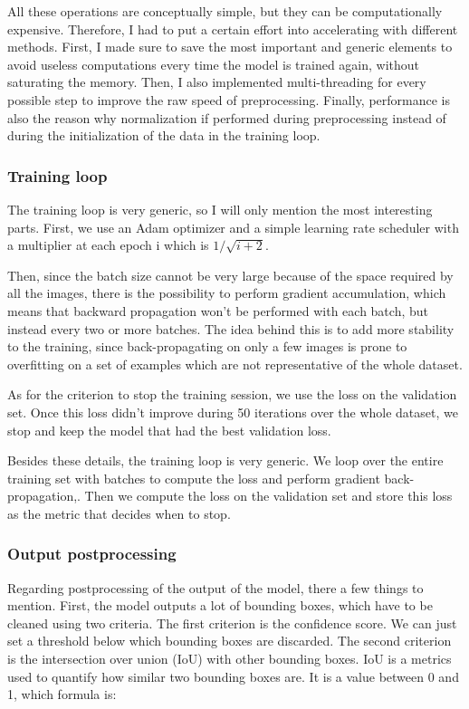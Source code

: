 \documentclass[
  letterpaper,
  DIV=11,
  numbers=noendperiod]{scrartcl}
\begin{document}
All these operations are conceptually simple, but they can be
computationally expensive. Therefore, I had to put a certain effort into
accelerating with different methods. First, I made sure to save the most
important and generic elements to avoid useless computations every time
the model is trained again, without saturating the memory. Then, I also
implemented multi-threading for every possible step to improve the raw
speed of preprocessing. Finally, performance is also the reason why
normalization if performed during preprocessing instead of during the
initialization of the data in the training loop.

\subsubsection{Training loop}\label{training-loop}

The training loop is very generic, so I will only mention the most
interesting parts. First, we use an Adam optimizer and a simple learning
rate scheduler with a multiplier at each epoch i which is
\(1/\sqrt{i+2}\).

Then, since the batch size cannot be very large because of the space
required by all the images, there is the possibility to perform gradient
accumulation, which means that backward propagation won't be performed
with each batch, but instead every two or more batches. The idea behind
this is to add more stability to the training, since back-propagating on
only a few images is prone to overfitting on a set of examples which are
not representative of the whole dataset.

As for the criterion to stop the training session, we use the loss on
the validation set. Once this loss didn't improve during 50 iterations
over the whole dataset, we stop and keep the model that had the best
validation loss.

Besides these details, the training loop is very generic. We loop over
the entire training set with batches to compute the loss and perform
gradient back-propagation,. Then we compute the loss on the validation
set and store this loss as the metric that decides when to stop.

\subsubsection{Output postprocessing}\label{output-postprocessing}

Regarding postprocessing of the output of the model, there a few things
to mention. First, the model outputs a lot of bounding boxes, which have
to be cleaned using two criteria. The first criterion is the confidence
score. We can just set a threshold below which bounding boxes are
discarded. The second criterion is the intersection over union (IoU)
with other bounding boxes. IoU is a metrics used to quantify how similar
two bounding boxes are. It is a value between 0 and 1, which formula is:
\end{document}
